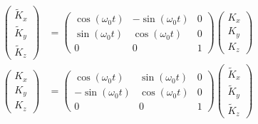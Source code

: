 \documentclass{article}
\begin{document}
\begin{align}
    \left(\begin{array}{c}
        \tilde{K}_{x}\\
        \tilde{K}_{y}\\
        \tilde{K}_{z}
    \end{array}\right)	&=\left(\begin{array}{ccc}
        \cos(\omega_{0}t) & -\sin(\omega_{0}t) & 0\\
        \sin(\omega_{0}t) & \cos(\omega_{0}t) & 0\\
        0 & 0 & 1
    \end{array}\right)\left(\begin{array}{c}
        K_{x}\\
        K_{y}\\
        K_{z}
    \end{array}\right)\\
    \left(\begin{array}{c}
        K_{x}\\
        K_{y}\\
        K_{z}
    \end{array}\right)	&=\left(\begin{array}{ccc}
        \cos(\omega_{0}t) & \sin(\omega_{0}t) & 0\\
        -\sin(\omega_{0}t) & \cos(\omega_{0}t) & 0\\
        0 & 0 & 1
    \end{array}\right)\left(\begin{array}{c}
        \tilde{K}_{x}\\
        \tilde{K}_{y}\\
        \tilde{K}_{z}
    \end{array}\right)
\end{align}
\end{document}
